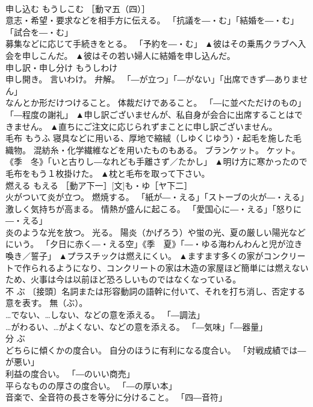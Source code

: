 \documentclass[8pt]{extreport}
\begin{document}
\begin{CJK}{UTF8}{min}
\\	申し込む	もうしこむ	［動マ五（四）］ 
\\	意志・希望・要求などを相手方に伝える。 「抗議を―・む」「結婚を―・む」「試合を―・む」 
\\	募集などに応じて手続きをとる。 「予約を―・む」	▲彼はその乗馬クラブへ入会を申しこんだ。 ▲彼はその若い婦人に結婚を申し込んだ。
\\	申し訳・申し分け	もうしわけ	
\\	申し開き。 言いわけ。 弁解。 「―が立つ」「―がない」「出席できず―ありません」 
\\	なんとか形だけつけること。 体裁だけであること。 「―に並べただけのもの」「―程度の謝礼」	▲申し訳ございませんが、私自身が会合に出席することはできません。 ▲直ちにご注文に応じられずまことに申し訳ございません。
\\	毛布	もうふ	寝具などに用いる、厚地で縮絨（しゆくじゆう）・起毛を施した毛織物。 混紡糸・化学繊維などを用いたものもある。 ブランケット。 ケット。 《季　冬》「いと古りし―なれども手離さず／たかし」	▲明け方に寒かったので毛布をもう１枚掛けた。 ▲枕と毛布を取って下さい。
\\	燃える	もえる	［動ア下一］[文]も・ゆ［ヤ下二］ 
\\	火がついて炎が立つ。 燃焼する。 「紙が―・える」「ストーブの火が―・える」 
\\	激しく気持ちが高まる。 情熱が盛んに起こる。 「愛国心に―・える」「怒りに―・える」 
\\	炎のような光を放つ。 光る。 陽炎（かげろう）や蛍の光、夏の厳しい陽光などにいう。 「夕日に赤く―・える空」《季　夏》「―・ゆる海わんわんと児が泣き喚き／誓子」	▲プラスチックは燃えにくい。 ▲ますます多くの家がコンクリートで作られるようになり、コンクリートの家は木造の家屋ほど簡単には燃えないため、火事は今は以前ほど恐ろしいものではなくなっている。
\\	不	ぶ	〔接頭〕名詞または形容動詞の語幹に付いて、それを打ち消し、否定する意を表す。 無（ぶ）。 
\\	…でない、…しない、などの意を添える。 「―調法」 
\\	…がわるい、…がよくない、などの意を添える。 「―気味」「―器量」	
\\	分	ぶ	
\\	どちらに傾くかの度合い。 自分のほうに有利になる度合い。 「対戦成績では―が悪い」 
\\	利益の度合い。 「―のいい商売」 
\\	平らなものの厚さの度合い。 「―の厚い本」 
\\	音楽で、全音符の長さを等分に分けること。 「四―音符」 

\end{CJK}
\end{document}
